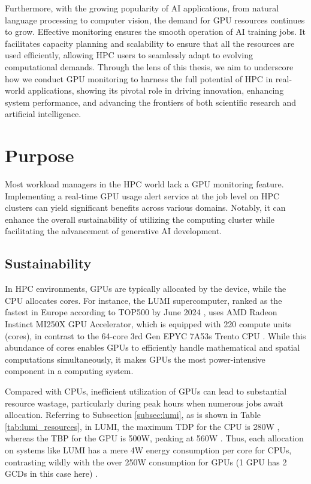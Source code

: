 Furthermore, with the growing popularity of AI applications, from natural language processing to computer vision, the demand for GPU resources continues to grow. Effective monitoring ensures the smooth operation of AI training jobs. It facilitates capacity planning and scalability to ensure that all the resources are used efficiently, allowing HPC users to seamlessly adapt to evolving computational demands. Through the lens of this thesis, we aim to underscore how we conduct GPU monitoring to harness the full potential of HPC in real-world applications, showing its pivotal role in driving innovation, enhancing system performance, and advancing the frontiers of both scientific research and artificial intelligence.

\section{Purpose}
Most workload managers in the HPC world lack a GPU monitoring feature. Implementing a real-time GPU usage alert service at the job level on HPC clusters can yield significant benefits across various domains. Notably, it can enhance the overall sustainability of utilizing the computing cluster while facilitating the advancement of generative AI development.

\subsection{Sustainability}

In HPC environments, GPUs are typically allocated by the device, while the CPU allocates cores. For instance, the LUMI supercomputer, ranked as the fastest in Europe according to TOP500 by June 2024 \cite{TOP500}, uses AMD Radeon Instinct MI250X GPU Accelerator, which is equipped with 220 compute units (cores), in contrast to the 64-core 3rd Gen EPYC 7A53s Trento CPU \cite{lumi}. While this abundance of cores enables GPUs to efficiently handle mathematical and spatial computations simultaneously, it makes GPUs the most power-intensive component in a computing system.

Compared with CPUs, inefficient utilization of GPUs can lead to substantial resource wastage, particularly during peak hours when numerous jobs await allocation. Referring to Subsection \ref{subsec:lumi}, as is shown in Table \ref{tab:lumi_resources}, in LUMI, the maximum TDP for the CPU is 280W \cite{amd-epyc-cpu}, whereas the TBP for the GPU is 500W, peaking at 560W \cite{amd-mi250x}. Thus, each allocation on systems like LUMI has a mere 4W energy consumption per core for CPUs, contrasting wildly with the over 250W consumption for GPUs (1 GPU has 2 GCDs in this case here) \cite{lumi}.

